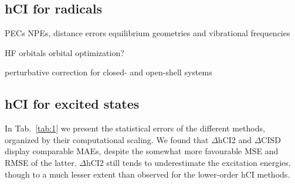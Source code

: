 \documentclass[aip,jcp,reprint,noshowkeys,superscriptaddress]{revtex4-1}
\begin{document}
\subsection{hCI for radicals}
\label{sec:res_A}


PECs
NPEs, distance errors
equilibrium geometries and vibrational frequencies

HF orbitals
orbital optimization?

perturbative correction for closed- and open-shell systems


\subsection{hCI for excited states}
\label{sec:res_B}

In Tab.~\ref{tab:1} we present the statistical errors of the different methods, organized by their computational scaling.
We found that $\Delta$hCI2 and $\Delta$CISD display comparable MAEs, despite the somewhat more favourable MSE and RMSE of the latter.
$\Delta$hCI2 still tends to underestimate the excitation energies, though to a much lesser extent than observed for the lower-order hCI methods.
\end{document}
